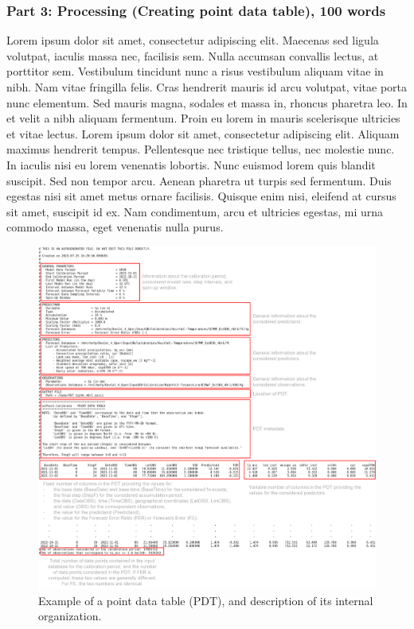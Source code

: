 \documentclass[techmemo]{ecmwfrep}%
\begin{document}
\subsubsection{Part 3: Processing (Creating point data table), 100 words}
Lorem ipsum dolor sit amet, consectetur adipiscing elit. Maecenas sed ligula volutpat, iaculis massa nec, facilisis sem. Nulla accumsan convallis lectus, at porttitor sem. Vestibulum tincidunt nunc a risus vestibulum aliquam vitae in nibh. Nam vitae fringilla felis. Cras hendrerit mauris id arcu volutpat, vitae porta nunc elementum. Sed mauris magna, sodales et massa in, rhoncus pharetra leo. In et velit a nibh aliquam fermentum. Proin eu lorem in mauris scelerisque ultricies et vitae lectus. Lorem ipsum dolor sit amet, consectetur adipiscing elit. Aliquam maximus hendrerit tempus. Pellentesque nec tristique tellus, nec molestie nunc. In iaculis nisi eu lorem venenatis lobortis. Nunc euismod lorem quis blandit suscipit. Sed non tempor arcu. Aenean pharetra ut turpis sed fermentum. Duis egestas nisi sit amet metus ornare facilisis. Quisque enim nisi, eleifend at cursus sit amet, suscipit id ex. Nam condimentum, arcu et ultricies egestas, mi urna commodo massa, eget venenatis nulla purus.

\begin{figure}
\includegraphics{Figures/Example_PDT.png}
\caption{Example of a point data table (PDT), and description of its internal organization.}
\label{Example_PDT}
\end{figure}
\end{document}
